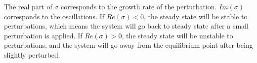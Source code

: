 The real part of $\sigma$ corresponds to the growth rate of the perturbation.
$Im(\sigma)$ corresponds to the oscillations.
If $Re(\sigma) < 0 $, the steady state will be stable to perturbations, which means the system will go back to steady state after a small perturbation is applied.
If $Re(\sigma) > 0 $, the steady state will be unstable to perturbations, and the system will go away from the equilibrium point after being slightly perturbed.
%
%
%
%
%
%
%
%
%
%
%
